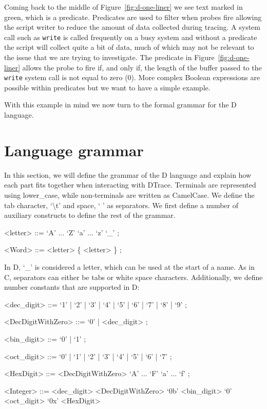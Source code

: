 Coming back to the middle of Figure~\ref{fig:d-one-liner} we see text
marked in green, which is a predicate.  Predicates are used to filter
when probes fire allowing the script writer to reduce the amount of
data collected during tracing.  A system call such as \texttt{write}
is called frequently on a busy system and without a predicate the
script will collect quite a bit of data, much of which may not be
relevant to the issue that we are trying to investigate.  The
predicate in Figure~\ref{fig:d-one-liner} allows the probe to fire if,
and only if, the length of the buffer passed to the \texttt{write}
system call is not equal to zero (0).
More complex Boolean expressions are possible within predicates but we
want to have a simple example.

With this example in mind we now turn to the formal grammar for the D
language.

\section{Language grammar}
\label{sec:grammar}

\setlength{\grammarparsep}{5pt plus 1pt minus 1pt} %
\setlength{\grammarindent}{12em} %

%



In this section, we will define the grammar of the D language and
explain how each part fits together when interacting with
DTrace. Terminals are represented using lower\_case, while
non-terminals are written as CamelCase. We define the tab character,
`\textbackslash t' and space, ` ' as separators. We first define a
number of auxiliary constructs to define the rest of the grammar.

\begin{grammar}
<letter> ::= `A' ... `Z'
	\alt `a' ... `z'
	\alt `\_' ;

<Word> ::= <letter> \{ <letter> \} ;
\end{grammar}

\noindent
In D, `\_' is considered a letter, which can be used at the start of a
name. As in C, separators can either be tabs or white space characters.
Additionally, we define number constants that are supported in D:

\begin{grammar}
<dec\_digit> ::= `1' | `2' | `3' | `4' | `5' | `6' | `7' | `8' | `9' ;

<DecDigitWithZero> ::= `0' | <dec\_digit> ;

<bin\_digit> ::= `0' | `1' ;

<oct\_digit> ::= `0' | `1' | `2' | `3' | `4' | `5' | `6' | `7' ;

<HexDigit> ::=  <DecDigitWithZero>
           \alt `A' ... `F'
           \alt `a' ... `f' ;

<Integer> ::=  <dec\_digit> <DecDigitWithZero>
          \alt `0b' <bin\_digit>
          \alt `0' <oct\_digit>
          \alt `0x' <HexDigit>
\end{grammar}

